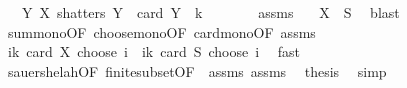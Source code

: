 \begin{isabellebody}
\ \ \ {\isachardoublequoteopen}{\isasymexists}Y{\isachardot}{\kern0pt}\ {\isacharparenleft}{\kern0pt}X\ shatters\ Y\ {\isasymand}\ card\ Y\ {\isacharequal}{\kern0pt}\ k\ {\isacharplus}{\kern0pt}\ {}{\isacharparenright}{\kern0pt}{\isachardoublequoteclose}\isanewline
%
\isadelimproof
%
\endisadelimproof
%
\isatagproof
{}\isamarkupfalse%
\ {\isacharminus}{\kern0pt}\isanewline
\ \ \isamarkupfalse%
\ assms{\isacharparenleft}{\kern0pt}{}{\isacharparenright}{\kern0pt}\ \isamarkupfalse%
\ {}{\isacharcolon}{\kern0pt}\ {\isachardoublequoteopen}{\isasymUnion}X\ {\isasymsubseteq}\ S{\isachardoublequoteclose}\ \isamarkupfalse%
\ blast\isanewline
\ \ \isamarkupfalse%
\ sum{\isacharunderscore}{\kern0pt}mono{\isacharbrackleft}{\kern0pt}OF\ choose{\isacharunderscore}{\kern0pt}mono{\isacharbrackleft}{\kern0pt}OF\ card{\isacharunderscore}{\kern0pt}mono{\isacharbrackleft}{\kern0pt}OF\ assms{\isacharparenleft}{\kern0pt}{}{\isacharparenright}{\kern0pt}\ {}{\isacharbrackright}{\kern0pt}{\isacharbrackright}{\kern0pt}{\isacharbrackright}{\kern0pt}\ \isamarkupfalse%
\ {\isachardoublequoteopen}{\isacharparenleft}{\kern0pt}{\isasymSum}i{\isasymle}k{\isachardot}{\kern0pt}\ card\ {\isacharparenleft}{\kern0pt}{\isasymUnion}X{\isacharparenright}{\kern0pt}\ choose\ i{\isacharparenright}{\kern0pt}\ {\isasymle}\ {\isacharparenleft}{\kern0pt}{\isasymSum}i{\isasymle}k{\isachardot}{\kern0pt}\ card\ S\ choose\ i{\isacharparenright}{\kern0pt}{\isachardoublequoteclose}\ \isamarkupfalse%
\ fast\isanewline
\ \ \isamarkupfalse%
\ sauer{\isacharunderscore}{\kern0pt}shelah{\isacharbrackleft}{\kern0pt}OF\ finite{\isacharunderscore}{\kern0pt}subset{\isacharbrackleft}{\kern0pt}OF\ {}\ assms{\isacharparenleft}{\kern0pt}{}{\isacharparenright}{\kern0pt}{\isacharbrackright}{\kern0pt}{\isacharbrackright}{\kern0pt}\ assms{\isacharparenleft}{\kern0pt}{}{\isacharparenright}{\kern0pt}\ \isamarkupfalse%
\ {\isacharquery}{\kern0pt}thesis\ \isamarkupfalse%
\ simp\isanewline
{}\isamarkupfalse%
%
\endisatagproof
{\isafoldproof}%
%
\isadelimproof
%
\endisadelimproof
%
\isadelimdocument
%
\endisadelimdocument
%
\isatagdocument
%
\isamarkuptrue%
%
\endisatagdocument
{\isafolddocument}%
%
\isadelimdocument
%
\endisadelimdocument
%
\begin{isamarkuptext}%

\end{isamarkuptext}
\end{isabellebody}
